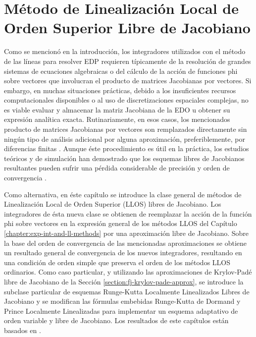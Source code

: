 \chapter{Método de Linealización Local de Orden Superior Libre de Jacobiano}\label{chapter:llrk-fj}


Como se mencionó en la introducción, los integradores utilizados con el método de las líneas para resolver EDP requieren típicamente de la resolución de grandes sistemas de ecuaciones algebraicas o del cálculo  de la acción de funciones phi sobre vectores que involucran el producto de matrices Jacobianas por vectores. Si embargo, en muchas situaciones prácticas, debido a los insuficientes recursos computacionales disponibles o al uso de discretizaciones espaciales complejas, no es viable evaluar y almacenar la matriz Jacobiana de la EDO u obtener su expresión analítica exacta. Rutinariamente, en esos casos, los mencionados producto de matrices Jacobianas por vectores son remplazados directamente sin ningún tipo de análisis adicional por alguna aproximación, preferiblemente, por diferencias finitas \cite{steihaug1979attempt,schmitt1995matrix,weiner1997rowmap,hochbruck1998exponential,hosseini1999matrix,tranquilli2014rosenbrock}. Aunque éste procedimiento es útil en la práctica, los estudios teóricos y de simulación han demostrado que los esquemas libres de Jacobianos resultantes pueden sufrir una pérdida considerable de precisión y orden de convergencia \cite{wanner1996solving,hochbruck1998exponential,tranquilli2014rosenbrock}.

Como alternativa, en éste capítulo se introduce la clase general de métodos de Linealización Local de Orden Superior (LLOS) libres de Jacobiano. Los integradores de ésta nueva clase se obtienen de reemplazar la acción de la función phi sobre vectores en la expresión general de los métodos LLOS del Capítulo \ref{chapter:exp-int-and-ll-methods} por una aproximación libre de Jacobiano. Sobre la base del orden de convergencia de las mencionadas aproximaciones se obtiene un resultado general de convergencia de los nuevos integradores, resultando en una condición de orden simple que preserva el orden de los métodos LLOS ordinarios. Como caso particular, y utilizando las aproximaciones de Krylov-Padé libre de Jacobiano de la Sección \ref{section:fj-krylov-pade-approx}, se introduce la subclase particular de esquemas Runge-Kutta Localmente Linealizados Libres de Jacobiano y se modifican las fórmulas embebidas Runge-Kutta de Dormand y Prince Localmente Linealizadas para implementar un esquema adaptativo de orden variable y libre de Jacobiano. Los resultados de este capítulos están basados en \cite{naranjo2022RT,naranjo2023jacobian}.

